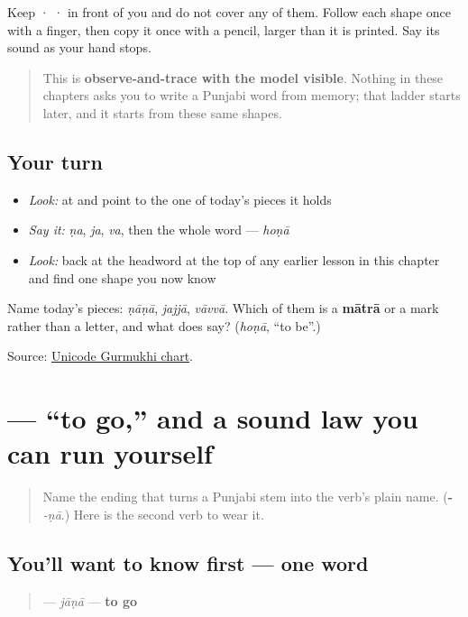 Keep  ·  ·  in front of you and do not cover any of them. Follow each shape once with a finger, then copy it once with a pencil, larger than it is printed. Say its sound as your hand stops.

\begin{quote}
This is \textbf{observe-and-trace with the model visible}. Nothing in these chapters asks you to write a Punjabi word from memory; that ladder starts later, and it starts from these same shapes.
\end{quote}

\subsection*{Your turn}
\begin{itemize}
\raggedright
  \item \emph{Look:} at \textbf{} and point to the one of today's pieces it holds
  \item \emph{Say it:} \emph{ṇa}, \emph{ja}, \emph{va}, then the whole word — \emph{hoṇā}
  \item \emph{Look:} back at the headword at the top of any earlier lesson in this chapter and find one shape you now know
\end{itemize}

\begin{tcolorbox}[breakable,colback=teal!4,colframe=teal!35!black,title={Before you move on}]
Name today's pieces: \emph{ṇāṇā}, \emph{jajjā}, \emph{vāvvā}. Which of them is a \textbf{mātrā} or a mark rather than a letter, and what does \textbf{} say? (\emph{hoṇā}, “to be”.)

Source: \href{https://www.unicode.org/charts/PDF/U0A00.pdf}{Unicode Gurmukhi chart}.
\end{tcolorbox}
\section[\texorpdfstring{\pa{ਜਾਣਾ} (jāṇā)}{ਜਾਣਾ (jāṇā)}]{ — “to go,” and a sound law you can run yourself}

\label{lesson:PA-C07-jana}



\begin{quote}
Name the ending that turns a Punjabi stem into the verb's plain name. (\textbf{-} \emph{-ṇā}.) Here is the second verb to wear it.
\end{quote}

\subsection*{You'll want to know first — one word}
\begin{quote}
\textbf{} — \emph{jāṇā} — \textbf{to go}
\end{quote}


